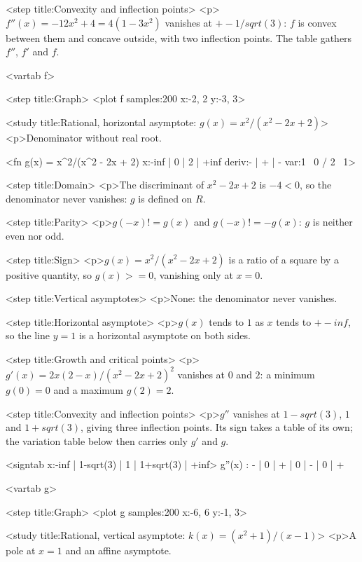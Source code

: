 \documentclass[
  margins=8,
  font=Latin Modern Roman,
  size=12,
  linespread=1.4,
  lang=en,
  precision=4
]{scholatex}
\begin{document}
<step title:{Convexity and inflection points}>{
<p>$f''(x) = -12x^2 + 4 = 4(1 - 3x^2)$ vanishes at $+- 1/sqrt(3)$:
$f$ is convex between them and concave outside, with two inflection
points. The table gathers $f''$, $f'$ and $f$.
}

<vartab f>

<step title:{Graph}>{
<plot f samples:200 x:{-2, 2} y:{-3, 3}>
}

<study title:{Rational, horizontal asymptote: $g(x) = x^2/(x^2-2x+2)$}>{
<p>Denominator without real root.
}

<fn g(x) = x^2/(x^2 - 2x + 2)
            x:{-inf | 0 | 2 | +inf}
            deriv:{- | + | -}
            var:{1 \ 0 / 2 \ 1}>

<step title:{Domain}>{
<p>The discriminant of $x^2 - 2x + 2$ is $-4 < 0$, so the denominator
never vanishes: $g$ is defined on $R$.
}

<step title:{Parity}>{
<p>$g(-x) != g(x)$ and $g(-x) != -g(x)$: $g$ is neither even nor
odd.
}

<step title:{Sign}>{
<p>$g(x) = x^2 / (x^2 - 2x + 2)$ is a ratio of a square by a positive
quantity, so $g(x) >= 0$, vanishing only at $x = 0$.
}

<step title:{Vertical asymptotes}>{
<p>None: the denominator never vanishes.
}

<step title:{Horizontal asymptote}>{
<p>$g(x)$ tends to $1$ as $x$ tends to $+- inf$, so the line $y = 1$
is a horizontal asymptote on both sides.
}

<step title:{Growth and critical points}>{
<p>$g'(x) = 2x(2-x)/(x^2-2x+2)^2$ vanishes at $0$ and $2$: a minimum
$g(0) = 0$ and a maximum $g(2) = 2$.
}

<step title:{Convexity and inflection points}>{
<p>$g''$ vanishes at $1-sqrt(3)$, $1$ and $1+sqrt(3)$, giving three
inflection points. Its sign takes a table of its own; the variation
table below then carries only $g'$ and $g$.
}

<signtab x:{-inf | 1-sqrt(3) | 1 | 1+sqrt(3) | +inf}>{
	g''(x) : - | 0 | + | 0 | - | 0 | +
}

<vartab g>

<step title:{Graph}>{
<plot g samples:200 x:{-6, 6} y:{-1, 3}>
}

<study title:{Rational, vertical asymptote: $k(x) = (x^2+1)/(x-1)$}>{
<p>A pole at $x = 1$ and an affine asymptote.
}
\end{document}
